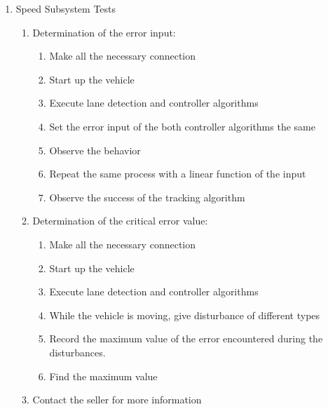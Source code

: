 \documentclass[a4paper,12pt]{article}
\begin{document}
\begin{enumerate}
\begin{enumerate}
\begin{enumerate}
		
	\end{enumerate}
	
	
	
	\item {Speed Subsystem Tests}
	\begin{enumerate}
		\item Determination of the error input:
		\begin{enumerate}
			\item Make all the necessary connection
			\item Start up the vehicle
			\item Execute lane detection and controller algorithms
			\item Set the error input of the both controller algorithms the same
			\item Observe the behavior
			\item Repeat the same process with a linear function of the input
			\item Observe the success of the tracking algorithm
		\end{enumerate}
		

		\item Determination of the critical error value: 
		\begin{enumerate}
			\item Make all the necessary connection
			\item Start up the vehicle
			\item Execute lane detection and controller algorithms
			\item While the vehicle is moving, give disturbance of different types
			\item Record the maximum value of the error encountered during the disturbances.
			\item Find the maximum value
		\end{enumerate}
	
					\item Contact the seller for more information 
				\end{enumerate}
		\end{enumerate}
		
		
		
		
	
		
		
	

\end{enumerate}
\end{document}

